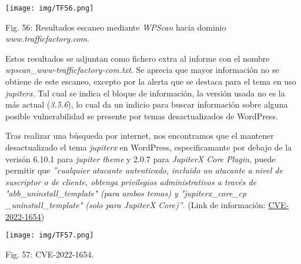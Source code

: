 \documentclass[12pt,oneside,a4paper]{book}
\begin{document}
\vspace{2em}

\begin{center}
	\texttt{[image: img/TF56.png]}
    
\vspace{0.1em}
    
    Fig. 56: Resultados escaneo mediante \textit{WPScan} hacia dominio \textit{www.trafficfactory.com}.
\end{center}

\vspace{2em}

\hspace{20pt}
Estos resultados se adjuntan como fichero extra al informe con el nombre \textit{wpscan\_www-trafficfactory-com.txt}. Se aprecia que mayor información no se obtiene de este escaneo, excepto por la alerta que se destaca para el tema en uso \textit{jupiterx}. Tal cual se indica el bloque de información, la versión usada no es la más actual (\textit{3.5.6}), lo cual da un indicio para buscar información sobre alguna posible vulnerabilidad se presente por temas desactualizados de WordPress. 

\vspace{1em}

\hspace{20pt}
Tras realizar una búsqueda por internet, nos encontramos que el mantener desactualizado el tema \textit{jupiterx} en WordPress, especificamante por debajo de la verisón 6.10.1 para \textit{jupiter theme} y 2.0.7 para \textit{JupiterX Core Plugin}, puede permitir que \textit{''cualquier atacante autenticado, incluido un atacante a nivel de suscriptor o de cliente, obtenga privilegios administrativos a través de "abb\_uninstall\_template" (para ambos temas) y "jupiterx\_core\_cp \newline \_uninstall\_template" (solo para JupiterX Core)''}. (Link de información: \href{https://cve.mitre.org/cgi-bin/cvename.cgi?name=CVE-2022-1654}{CVE-2022-1654})

\vspace{2em}

\begin{center}
	\texttt{[image: img/TF57.png]}
    
\vspace{0.1em}
    
    Fig. 57: CVE-2022-1654.
\end{center}

\vspace{2em}
\end{document}
